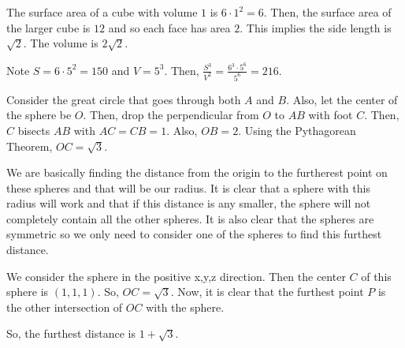 \documentclass[11pt]{article}
\begin{document}
\begin{sol}
The surface area of a cube with volume $1$ is $6\cdot 1^2=6$. Then, the surface area of the larger cube is $12$ and so each face has area $2$. This implies the side length is $\sqrt{2}$. The volume is $2\sqrt{2}$.
\end{sol}


\begin{sol}
Note $S=6\cdot 5^2=150$ and $V=5^3$. Then, $\frac{S^3}{V^2}=\frac{6^3\cdot 5^6}{5^6}=\boxed{216}$.
\end{sol}


\begin{sol}
Consider the great circle that goes through both $A$ and $B$. Also, let the center of the sphere be $O$. Then, drop the perpendicular from $O$ to $AB$ with foot $C$. Then, $C$ bisects $AB$ with $AC=CB=1$. Also, $OB=2$. Using the Pythagorean Theorem, $OC=\boxed{\sqrt{3}}$.
\end{sol}


\begin{sol}
We are basically finding the distance from the origin to the furtherest point on these spheres and that will be our radius. It is clear that a sphere with this radius will work and that if this distance is any smaller, the sphere will not completely contain all the other spheres. It is also clear that the spheres are symmetric so we only need to consider one of the spheres to find this furthest distance.  

We consider the sphere in the positive x,y,z direction. Then the center $C$ of this sphere is $(1,1,1)$. So, $OC=\sqrt{3}$. Now, it is clear that the furthest point $P$ is the other intersection of $OC$ with the sphere. 

So, the furthest distance is $\boxed{1+\sqrt{3}}$.
\end{sol}
\end{document}
